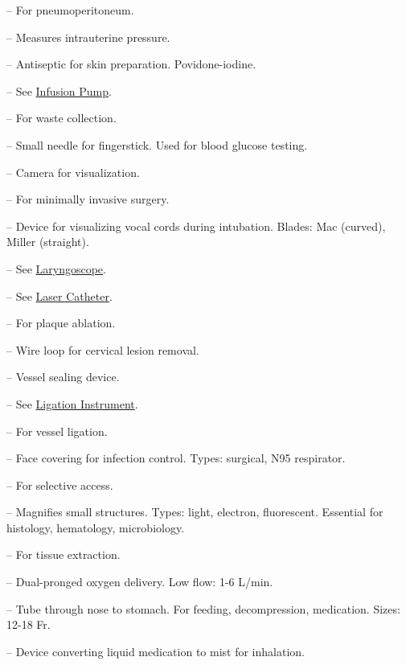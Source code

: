 -- For pneumoperitoneum.

-- Measures intrauterine pressure.

-- Antiseptic for skin preparation. Povidone-iodine.

-- See \hyperlink{Infusion Pump}{Infusion Pump}.

-- For waste collection.

-- Small needle for fingerstick. Used for blood glucose testing.

-- Camera for visualization.

-- For minimally invasive surgery.


-- Device for visualizing vocal cords during intubation. Blades: Mac (curved), Miller (straight).

-- See \hyperlink{Laryngoscope}{Laryngoscope}.


-- See \hyperlink{Laser Catheter}{Laser Catheter}.

-- For plaque ablation.

-- Wire loop for cervical lesion removal.

-- Vessel sealing device.

-- See \hyperlink{Ligation Instrument}{Ligation Instrument}.

-- For vessel ligation.

-- Face covering for infection control. Types: surgical, N95 respirator.

-- For selective access.

-- Magnifies small structures. Types: light, electron, fluorescent. Essential for histology, hematology, microbiology.

-- For tissue extraction.

-- Dual-pronged oxygen delivery. Low flow: 1-6 L/min.

-- Tube through nose to stomach. For feeding, decompression, medication. Sizes: 12-18 Fr.

-- Device converting liquid medication to mist for inhalation.

